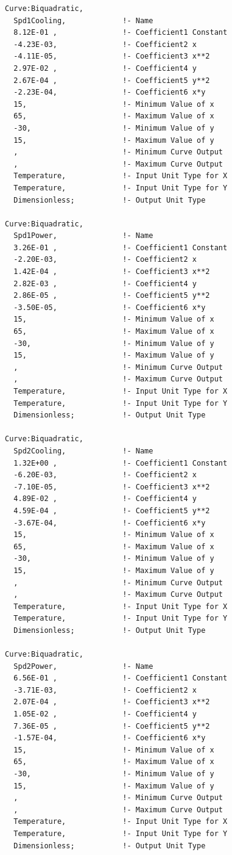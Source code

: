 \begin{lstlisting}
Curve:Biquadratic,
  Spd1Cooling,             !- Name
  8.12E-01 ,               !- Coefficient1 Constant
  -4.23E-03,               !- Coefficient2 x
  -4.11E-05,               !- Coefficient3 x**2
  2.97E-02 ,               !- Coefficient4 y
  2.67E-04 ,               !- Coefficient5 y**2
  -2.23E-04,               !- Coefficient6 x*y
  15,                      !- Minimum Value of x
  65,                      !- Maximum Value of x
  -30,                     !- Minimum Value of y
  15,                      !- Maximum Value of y
  ,                        !- Minimum Curve Output
  ,                        !- Maximum Curve Output
  Temperature,             !- Input Unit Type for X
  Temperature,             !- Input Unit Type for Y
  Dimensionless;           !- Output Unit Type

Curve:Biquadratic,
  Spd1Power,               !- Name
  3.26E-01 ,               !- Coefficient1 Constant
  -2.20E-03,               !- Coefficient2 x
  1.42E-04 ,               !- Coefficient3 x**2
  2.82E-03 ,               !- Coefficient4 y
  2.86E-05 ,               !- Coefficient5 y**2
  -3.50E-05,               !- Coefficient6 x*y
  15,                      !- Minimum Value of x
  65,                      !- Maximum Value of x
  -30,                     !- Minimum Value of y
  15,                      !- Maximum Value of y
  ,                        !- Minimum Curve Output
  ,                        !- Maximum Curve Output
  Temperature,             !- Input Unit Type for X
  Temperature,             !- Input Unit Type for Y
  Dimensionless;           !- Output Unit Type

Curve:Biquadratic,
  Spd2Cooling,             !- Name
  1.32E+00 ,               !- Coefficient1 Constant
  -6.20E-03,               !- Coefficient2 x
  -7.10E-05,               !- Coefficient3 x**2
  4.89E-02 ,               !- Coefficient4 y
  4.59E-04 ,               !- Coefficient5 y**2
  -3.67E-04,               !- Coefficient6 x*y
  15,                      !- Minimum Value of x
  65,                      !- Maximum Value of x
  -30,                     !- Minimum Value of y
  15,                      !- Maximum Value of y
  ,                        !- Minimum Curve Output
  ,                        !- Maximum Curve Output
  Temperature,             !- Input Unit Type for X
  Temperature,             !- Input Unit Type for Y
  Dimensionless;           !- Output Unit Type

Curve:Biquadratic,
  Spd2Power,               !- Name
  6.56E-01 ,               !- Coefficient1 Constant
  -3.71E-03,               !- Coefficient2 x
  2.07E-04 ,               !- Coefficient3 x**2
  1.05E-02 ,               !- Coefficient4 y
  7.36E-05 ,               !- Coefficient5 y**2
  -1.57E-04,               !- Coefficient6 x*y
  15,                      !- Minimum Value of x
  65,                      !- Maximum Value of x
  -30,                     !- Minimum Value of y
  15,                      !- Maximum Value of y
  ,                        !- Minimum Curve Output
  ,                        !- Maximum Curve Output
  Temperature,             !- Input Unit Type for X
  Temperature,             !- Input Unit Type for Y
  Dimensionless;           !- Output Unit Type
\end{lstlisting}

